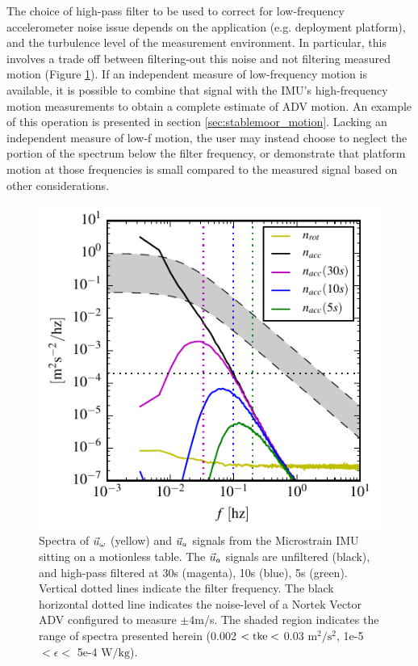 \documentclass[twocol]{ametsoc}
\newlength{\onewidth}
\begin{document}
The choice of high-pass filter to be used to correct for low-frequency accelerometer noise issue depends on the application (e.g. deployment platform), and the turbulence level of the measurement environment. In particular, this involves a trade off between filtering-out this noise and not filtering measured motion (Figure \ref{fig:stationary_noise}). If an independent measure of low-frequency motion is available, it is possible to combine that signal with the IMU's high-frequency motion measurements to obtain a complete estimate of ADV motion. An example of this operation is presented in section \ref{sec:stablemoor_motion}. Lacking an independent measure of low-f motion, the user may instead choose to neglect the portion of the spectrum below the filter frequency, or demonstrate that platform motion at those frequencies is small compared to the measured signal based on other considerations. 

\begin{figure}
  \centering
  \label{fig:stationary_noise}
  \includegraphics[width=\onewidth]{stationary_noise03}
  \caption{Spectra of $\vec{u}_\omega$ (yellow) and $\vec{u}_a$ signals from the Microstrain IMU sitting on a motionless table. The $\vec{u}_a$ signals are unfiltered (black), and high-pass filtered at 30s (magenta), 10s (blue), 5s (green). Vertical dotted lines indicate the filter frequency. The black horizontal dotted line indicates the noise-level of a Nortek Vector ADV configured to measure $\pm$4m/s. The shaded region indicates the range of spectra presented herein (0.002 $< \mathrm{tke} <$ 0.03 $\mathrm{m^2/s^2}$, 1e-5 $< \epsilon <$ 5e-4 $\mathrm{W/kg}$).}
\end{figure}
\end{document}
